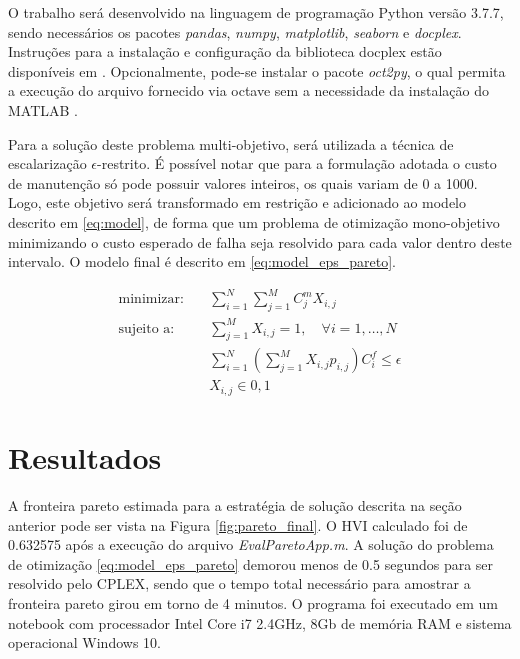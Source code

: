 \documentclass[conference]{IEEEtran}
\begin{document}
O trabalho será desenvolvido na linguagem de programação Python versão 3.7.7, sendo necessários os pacotes \textit{pandas}, \textit{numpy}, \textit{matplotlib}, \textit{seaborn} e \textit{docplex}. Instruções para a instalação e configuração da biblioteca docplex estão disponíveis em \cite{docplex:online}. Opcionalmente, pode-se instalar o pacote \textit{oct2py}, o qual permita a execução do arquivo fornecido via octave sem a necessidade da instalação do MATLAB \cite{oct2py:online}.

Para a solução deste problema multi-objetivo, será utilizada a técnica de escalarização $\epsilon$-restrito. É possível notar que para a formulação adotada o custo de manutenção só pode possuir valores inteiros, os quais variam de 0 a 1000. Logo, este objetivo será transformado em restrição e adicionado ao modelo descrito em \ref{eq:model}, de forma que um problema de otimização mono-objetivo minimizando o custo esperado de falha seja resolvido para cada valor dentro deste intervalo. O modelo final é descrito em \ref{eq:model_eps_pareto}.

\begin{equation}
	\begin{alignedat}{2}
		\text{minimizar:} & \quad \sum_{i=1}^{N}\sum_{j=1}^{M}C_j^{m}X_{i,j}  \\
		\text{sujeito a:} & \quad \sum_{j=1}^{M}X_{i,j} = 1, \quad \forall i = 1,\dots,N \\
		& \quad \sum_{i=1}^{N}(\sum_{j=1}^{M}X_{i,j}p_{i,j})C_i^f \leq \epsilon \\
		& \quad X_{i,j} \in {0,1}
	\end{alignedat}
	\label{eq:model_eps_pareto}
\end{equation}


\section{Resultados}

A fronteira pareto estimada para a estratégia de solução descrita na seção anterior pode ser vista na Figura \ref{fig:pareto_final}. O HVI calculado foi de 0.632575 após a execução do arquivo \textit{EvalParetoApp.m}. A solução do problema de otimização \ref{eq:model_eps_pareto} demorou menos de 0.5 segundos para ser resolvido pelo CPLEX, sendo que o tempo total necessário para amostrar a fronteira pareto girou em torno de 4 minutos. O programa foi executado em um notebook com processador Intel Core i7 2.4GHz, 8Gb de memória RAM e sistema operacional Windows 10.
\end{document}
